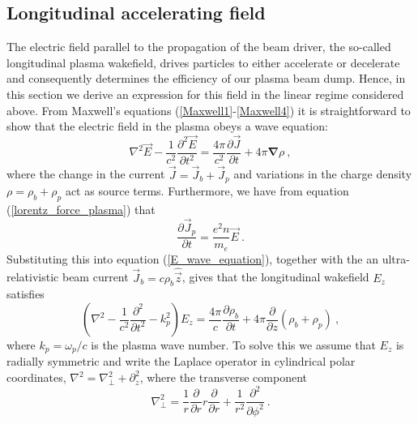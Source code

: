 \subsection{Longitudinal accelerating field} 
The electric field parallel to the propagation of the beam driver, the so-called longitudinal plasma wakefield, drives particles to either accelerate or decelerate and consequently determines the efficiency of our plasma beam dump. Hence, in this section we derive an expression for this field in the linear regime considered above. 
From Maxwell's equations (\ref{Maxwell1}-\ref{Maxwell4}) it is straightforward to show that the electric field in the plasma obeys a wave equation:
\begin{equation}
\nabla^2\vec{E}-\frac{1}{c^2}\frac{\partial^2 \vec{E}}{\partial t^2}=\frac{4\pi}{c^2}\frac{\partial \vec{J}}{\partial t}+4\pi\boldsymbol{\nabla}\rho~,
\label{E_wave_equation}
\end{equation}
where the change in the current $\vec{J}=\vec{J}_b+\vec{J}_p$ and variations in the charge density $\rho=\rho_b+\rho_p$ act as source terms. Furthermore, we have from equation (\ref{lorentz_force_plasma}) that 
\begin{equation}
\frac{\partial \vec{J}_p}{\partial t}=\frac{e^2 n}{m_e}\vec{E}~.
\end{equation}
Substituting this into equation (\ref{E_wave_equation}), together with the an ultra-relativistic beam current $\vec{J}_b=c\rho_b\hat{\vec{z}}$, gives that the longitudinal wakefield $E_z$ satisfies
\begin{equation}
\left(\nabla^2-\frac{1}{c^2}\frac{\partial^2}{\partial t^2}-k_p^2\right)E_z=\frac{4\pi}{c}\frac{\partial \rho_b}{\partial t}+4\pi\frac{\partial}{\partial z}\left(\rho_b+\rho_p\right)~,
\label{Ez_wave_equation}
\end{equation}
where $k_p=\omega_p/c$ is the plasma wave number. To solve this we assume that $E_z$ is radially symmetric and write the Laplace operator in cylindrical polar coordinates, $\nabla^2=\nabla^2_{\perp}+\partial^2_z$, where the transverse component
\begin{equation}
\nabla_{\perp}^2=\frac{1}{r}\frac{\partial }{\partial r}r\frac{\partial }{\partial r} +\frac{1}{r^2}\frac{\partial^2 }{\partial \phi^2} ~.
\end{equation}
